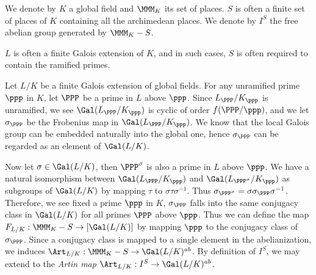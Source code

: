 


\begin{notation}
    We denote by $K$ a global field and $\MMM_K$ its set of places. $S$ is often a finite set of places of $K$ containing all the archimedean places. We denote by $I^S$ the free abelian group generated by $\MMM_K-S$.

    $L$ is often a finite Galois extension of $K$, and in such cases, $S$ is often required to contain the ramified primes.
\end{notation}

\begin{analysis}
     Let $L/K$ be a finite Galois extension of global fields. For any unramified prime $\ppp$ in $K$, let $\PPP$ be a prime in $L$ above $\ppp$. Since $L_\PPP/K_\ppp$ is unramified, we see $\Gal(L_\PPP/K_\ppp)$ is cyclic of order $f(\PPP/\ppp)$, and we let $\sigma_\PPP$ be the Frobenius map in $\Gal(L_\PPP/K_\ppp)$. We know that the local Galois group can be embedded naturally into the global one, hence $\sigma_\PPP$ can be regarded as an element of $\Gal(L/K)$.

     Now let $\sigma\in\Gal(L/K)$, then $\PPP^\sigma$ is also a prime in $L$ above $\ppp$. We have a natural isomorphism between $\Gal(L_\PPP/K_\ppp)$ and $\Gal(L_{\PPP^\sigma}/K_\ppp)$ as subgroups of $\Gal(L/K)$ by mapping $\tau$ to $\sigma\tau\sigma^{-1}$. Thus $\sigma_{\PPP^\sigma}=\sigma\sigma_\PPP\sigma^{-1}$. Therefore, we see fixed a prime $\ppp$ in $K$, $\sigma_\PPP$ falls into the same conjugacy class in $\Gal(L/K)$ for all primes $\PPP$ above $\ppp$. Thus we can define the map $F_{L/K}:\MMM_K-S\to[\Gal(L/K)]$ by mapping $\ppp$ to the conjugacy class of $\sigma_\PPP$. Since a conjugacy class is mapped to a single element in the abelianization, we induces $\Art_{L/K}:\MMM_K-S\to\Gal(L/K)^{ab}$. By definition of $I^S$, we may extend to the \emph{Artin map} $\Art_{L/K}:I^S\to\Gal(L/K)^{ab}$.
\end{analysis}

